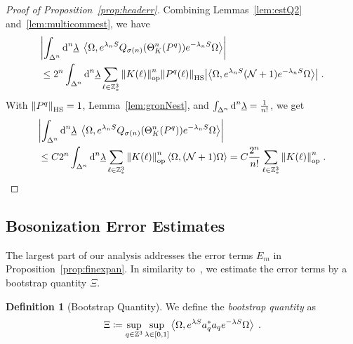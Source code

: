 \documentclass[12pt,a4paper]{article}
\numberwithin{equation}{section}
\newcommand{\ulambda}{\underline{\lambda}}
\newcommand{\1}{\mathbb{I}}
\newcommand{\di}{\textnormal{d}}
\newcommand{\HS}{\mathrm{HS}}
\newcommand{\Z}{\mathbb{Z}}
\newcommand{\NN}{\mathcal{N}}
\newcommand{\eva}[1]{\left\langle #1 \right\rangle}
\theoremstyle{plain}
\theoremstyle{definition}
\newtheorem{definition}[theorem]{Definition}
\theoremstyle{remark}
\theoremstyle{plain}
\theoremstyle{definition}
\theoremstyle{remark}
\begin{document}
\begin{proof}[Proof of Proposition~\ref{prop:headerr}]
Combining Lemmas~\ref{lem:estQ2} and~\ref{lem:multicommest}, we have
\begin{equation}
\begin{aligned}
	&\abs{\int_{\Delta^n} \di^n \ulambda \;
		\eva{\Omega, e^{\lambda_n S} Q_{\sigma(n)}(\Theta^n_{K}(P^q)) e^{-\lambda_n S} \Omega} } \\
	&\leq 2^n \int_{\Delta^n} \di^n \ulambda \sum_{\ell \in \Z^3_*} \norm{K(\ell)}^n_{\mathrm{op}} \norm{P^q(\ell)}_{\HS} 
		\abs{\eva{\Omega, e^{\lambda_n S} (\NN +1) e^{-\lambda_n S} \Omega}} \;.
\end{aligned}
\end{equation}
With $ \norm{P^q}_{\HS} = 1$, Lemma~\ref{lem:gronNest}, and $ \int_{\Delta^n} \di^n\underline{\lambda} = \frac{1}{n!} $, we get
\begin{align*}
	&\abs{\int_{\Delta^n} \di^n \ulambda \;
		\eva{\Omega, e^{\lambda_n S} Q_{\sigma(n)}(\Theta^n_{K}(P^q)) e^{-\lambda_n S} \Omega} }
	\\
	& \leq C 2^n \int_{\Delta^n} \di^n \ulambda \sum_{\ell \in \Z^3_*} \norm{K(\ell)}^n_{\mathrm{op}} \eva{\Omega,(\NN+1)\Omega} =  C \frac{2^n}{n!} \sum_{\ell \in \Z^3_*} \norm{K(\ell)}^n_{\mathrm{op}} \;. \qedhere
\end{align*}
\end{proof}






\subsection{Bosonization Error Estimates}
\label{subsec:bos_error}

The largest part of our analysis addresses the error terms $ E_m $ in Proposition~\ref{prop:finexpan}. In similarity to~\cite{BL25}, we estimate the error terms by a  bootstrap quantity $ \Xi $.

\begin{definition}[Bootstrap Quantity] We define the \emph{bootstrap quantity} as
\begin{equation} \label{eq:Xi}
	\Xi \coloneq \sup\limits_{q \in \Z^3} \sup\limits_{\lambda \in [0,1]}\expval{\Omega, e^{\lambda S} a^*_q a_q e^{-\lambda S} \Omega} \;.
\end{equation}
\end{definition}
\end{document}
